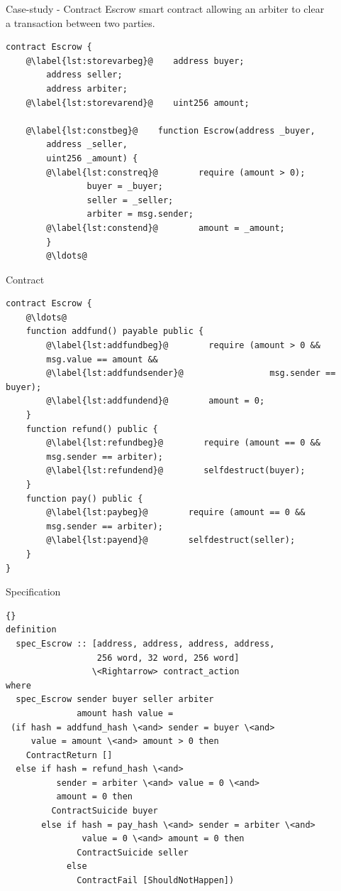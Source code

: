 \documentclass{beamer}
\begin{document}
\begin{frame}[fragile]{Case-study - Contract}
Escrow smart contract allowing an arbiter to clear\\
a transaction between two parties.\\
		\begin{lstlisting}[language=Solidity]
contract Escrow {
	@\label{lst:storevarbeg}@    address buyer;
	    address seller;
	    address arbiter;
	@\label{lst:storevarend}@    uint256 amount;
	
	@\label{lst:constbeg}@    function Escrow(address _buyer,
	    address _seller,
	    uint256 _amount) {
		@\label{lst:constreq}@        require (amount > 0);
		        buyer = _buyer;
		        seller = _seller;
		        arbiter = msg.sender;
		@\label{lst:constend}@        amount = _amount;
	    }
	    @\ldots@
	\end{lstlisting}
	\end{frame}
	
	\begin{frame}[fragile]{Contract}
		\begin{lstlisting}[language=Solidity]
contract Escrow {
    @\ldots@
    function addfund() payable public {
		@\label{lst:addfundbeg}@        require (amount > 0 &&
        msg.value == amount &&
		@\label{lst:addfundsender}@                 msg.sender == buyer);
		@\label{lst:addfundend}@        amount = 0;
    }
    function refund() public {
		@\label{lst:refundbeg}@        require (amount == 0 &&
        msg.sender == arbiter);
		@\label{lst:refundend}@        selfdestruct(buyer);
    }
    function pay() public {
		@\label{lst:paybeg}@        require (amount == 0 &&
        msg.sender == arbiter);
		@\label{lst:payend}@        selfdestruct(seller);
    }
}
		\end{lstlisting}
\end{frame}

\begin{frame}[fragile]{Specification}
\begin{lstlisting}[language=Isar,keywords={[3]{addfund\_hash,pay\_hash,refund\_hash,}}]{} 
definition 
  spec_Escrow :: [address, address, address, address, 
                  256 word, 32 word, 256 word]
                 \<Rightarrow> contract_action
where
  spec_Escrow sender buyer seller arbiter 
              amount hash value =
 (if hash = addfund_hash \<and> sender = buyer \<and>
     value = amount \<and> amount > 0 then
    ContractReturn []
  else if hash = refund_hash \<and>
          sender = arbiter \<and> value = 0 \<and>
          amount = 0 then
         ContractSuicide buyer
       else if hash = pay_hash \<and> sender = arbiter \<and>
               value = 0 \<and> amount = 0 then
              ContractSuicide seller
            else
              ContractFail [ShouldNotHappen])
		\end{lstlisting}
	\end{frame}
	
\end{document}
